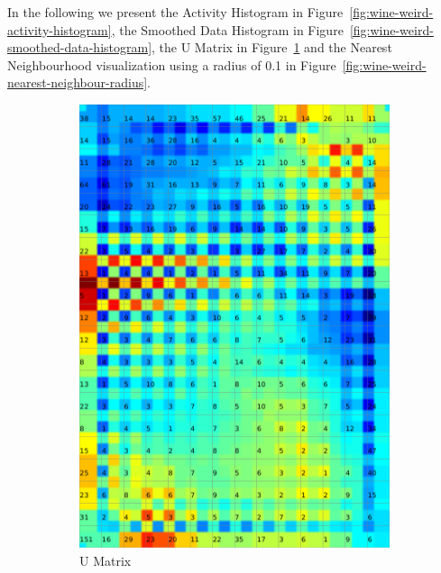 \documentclass{acm_proc_article-sp}
\begin{document}
In the following we present the Activity Histogram in Figure~\ref{fig:wine-weird-activity-histogram},
the Smoothed Data Histogram in Figure~\ref{fig:wine-weird-smoothed-data-histogram},
the U Matrix in Figure~\ref{fig:wine-weird-u-matrix} and
the Nearest Neighbourhood visualization using a radius of 0.1 in Figure~\ref{fig:wine-weird-nearest-neighbour-radius}.

\begin{figure}
\centering
    \centering
    \begin{subfigure}[b]{0.45\linewidth}
        \includegraphics[width=\linewidth]{img/wine-weird-u-matrix}
        \caption{U Matrix}
        \label{fig:wine-weird-u-matrix}
    \end{subfigure}
    \begin{subfigure}[b]{0.45\linewidth}

\end{subfigure}
\end{figure}
\end{document}

